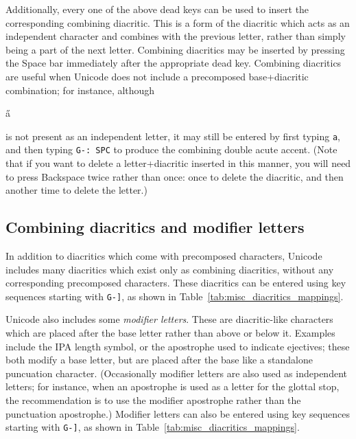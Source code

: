 \documentclass[oneside]{memoir}
\newcommand{\key}{\verb}
\newcommand{\out}[1]{\colorbox{gray!20}{\strut{}#1}}
\begin{document}
{Additionally, every one of the above dead keys can be used to insert the corresponding combining diacritic.
This is a form of the diacritic which acts as an independent character and combines with the previous letter,
  rather than simply being a part of the next letter.
Combining diacritics may be inserted by pressing the Space bar immediately after the appropriate dead key.
Combining diacritics are useful when Unicode does not include a precomposed base+diacritic combination;
  for instance, although \out{a̋} is not present as an independent letter,
  it may still be entered by first typing \key|a|, and then typing \key|G-: SPC| to produce the combining double acute accent.
(Note that if you want to delete a letter+diacritic inserted in this manner,
 you will need to press Backspace twice rather than once:
  once to delete the diacritic, and then another time to delete the letter.)

\subsection{Combining diacritics and modifier letters}
\label{sec:combining_diacritics}

In addition to diacritics which come with precomposed characters, Unicode includes many diacritics which exist only as combining diacritics,
  without any corresponding precomposed characters.
These diacritics can be entered using key sequences starting with \key|G-]|, as shown in Table~\ref{tab:misc_diacritics_mappings}.

Unicode also includes some \textit{modifier letters}.
These are diacritic-like characters which are placed after the base letter rather than above or below it.
Examples include the \textsc{IPA} length symbol, or the apostrophe used to indicate ejectives;
  these both modify a base letter, but are placed after the base like a standalone puncuation character.
(Occasionally modifier letters are also used as independent letters;
  for instance, when an apostrophe is used as a letter for the glottal stop,
  the recommendation is to use the modifier apostrophe rather than the punctuation apostrophe.)
Modifier letters can also be entered using key sequences starting with \key|G-]|, as shown in Table~\ref{tab:misc_diacritics_mappings}.

}
\end{document}
